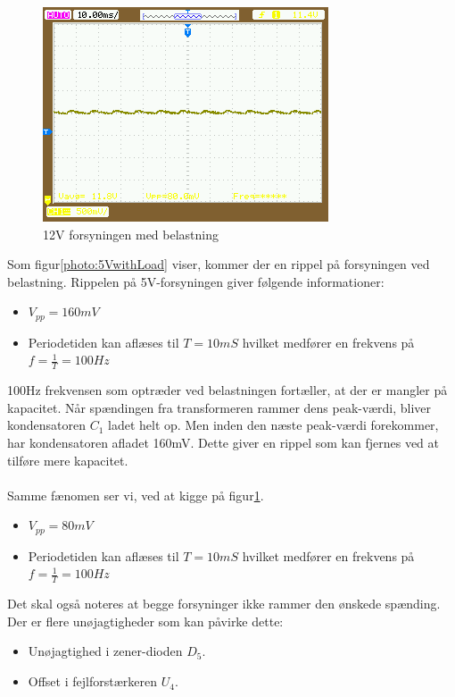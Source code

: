 \begin{figure}[H]
	\centering
	\includegraphics[scale=1]{../Hardware/PSU/Realisering/12VwithLoad}
	\caption{12V forsyningen med belastning}
	\label{photo:12VwithLoad}
\end{figure}

Som figur\ref{photo:5VwithLoad} viser, kommer der en rippel på forsyningen ved belastning. Rippelen på 5V-forsyningen giver følgende informationer:

\begin{itemize}
\item $V_{pp} = 160mV$
\item Periodetiden kan aflæses til $T = 10mS$ hvilket medfører en frekvens på $f = \frac{1}{T} = 100Hz$
\end{itemize}

100Hz frekvensen som optræder ved belastningen fortæller, at der er mangler på kapacitet. Når spændingen fra transformeren rammer dens peak-værdi, bliver kondensatoren $C_1$ ladet helt op. Men inden den næste peak-værdi forekommer, har kondensatoren afladet 160mV. Dette giver en rippel som kan fjernes ved at tilføre mere kapacitet.
\\\\
Samme fænomen ser vi, ved at kigge på figur\ref{photo:12VwithLoad}.
\begin{itemize}
\item $V_{pp} = 80mV$
\item Periodetiden kan aflæses til $T = 10mS$ hvilket medfører en frekvens på $f = \frac{1}{T} = 100Hz$ 
\end{itemize}

Det skal også noteres at begge forsyninger ikke rammer den ønskede spænding. Der er flere unøjagtigheder som kan påvirke dette:
\begin{itemize}
\item Unøjagtighed i zener-dioden $D_5$.
\item Offset i fejlforstærkeren $U_4$.
\end{itemize}


